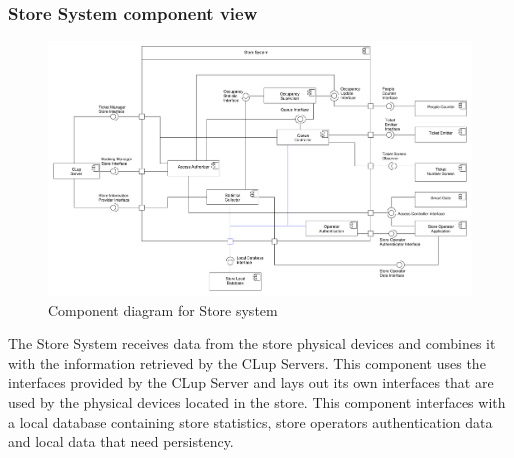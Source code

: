 \subsubsection{Store System component view}
\begin{figure}[H]
    \includegraphics[width=\textwidth]{Images/UML_store_system_component.pdf}
    \caption{\label{fig:UML_comp_CLup_store_system}Component diagram for Store system}
\end{figure}

The Store System receives data from the store physical devices and combines it with the information retrieved by the CLup Servers. This component uses the interfaces provided by the CLup Server and lays out its own interfaces that are used by the physical devices located in the store. This component interfaces with a local database containing store statistics, store operators authentication data and local data that need persistency.

